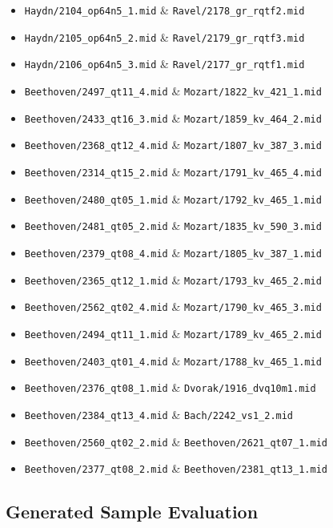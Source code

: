 \documentclass[sigconf,authorversion]{acmart}
\providecommand{\tightlist}{%
  \setlength{\itemsep}{0pt}\setlength{\parskip}{0pt}}
\begin{document}
\begin{itemize}
\tightlist
\item \texttt{Haydn/2104\_op64n5\_1.mid} \& \texttt{Ravel/2178\_gr\_rqtf2.mid}
\item \texttt{Haydn/2105\_op64n5\_2.mid} \&   \texttt{Ravel/2179\_gr\_rqtf3.mid}
\item \texttt{Haydn/2106\_op64n5\_3.mid} \&   \texttt{Ravel/2177\_gr\_rqtf1.mid}
\item \texttt{Beethoven/2497\_qt11\_4.mid} \& \texttt{Mozart/1822\_kv\_421\_1.mid}
\item \texttt{Beethoven/2433\_qt16\_3.mid} \& \texttt{Mozart/1859\_kv\_464\_2.mid}
\item \texttt{Beethoven/2368\_qt12\_4.mid} \& \texttt{Mozart/1807\_kv\_387\_3.mid}
\item \texttt{Beethoven/2314\_qt15\_2.mid} \& \texttt{Mozart/1791\_kv\_465\_4.mid}
\item \texttt{Beethoven/2480\_qt05\_1.mid} \& \texttt{Mozart/1792\_kv\_465\_1.mid}
\item \texttt{Beethoven/2481\_qt05\_2.mid} \& \texttt{Mozart/1835\_kv\_590\_3.mid}
\item \texttt{Beethoven/2379\_qt08\_4.mid} \& \texttt{Mozart/1805\_kv\_387\_1.mid}
\item \texttt{Beethoven/2365\_qt12\_1.mid} \& \texttt{Mozart/1793\_kv\_465\_2.mid}
\item \texttt{Beethoven/2562\_qt02\_4.mid} \& \texttt{Mozart/1790\_kv\_465\_3.mid}
\item \texttt{Beethoven/2494\_qt11\_1.mid} \& \texttt{Mozart/1789\_kv\_465\_2.mid}
\item \texttt{Beethoven/2403\_qt01\_4.mid} \& \texttt{Mozart/1788\_kv\_465\_1.mid}
\item \texttt{Beethoven/2376\_qt08\_1.mid} \& \texttt{Dvorak/1916\_dvq10m1.mid}
\item \texttt{Beethoven/2384\_qt13\_4.mid} \& \texttt{Bach/2242\_vs1\_2.mid}
\item \texttt{Beethoven/2560\_qt02\_2.mid} \& \texttt{Beethoven/2621\_qt07\_1.mid}
\item \texttt{Beethoven/2377\_qt08\_2.mid} \& \texttt{Beethoven/2381\_qt13\_1.mid}
\end{itemize}

\subsection{Generated Sample Evaluation}
\end{document}
